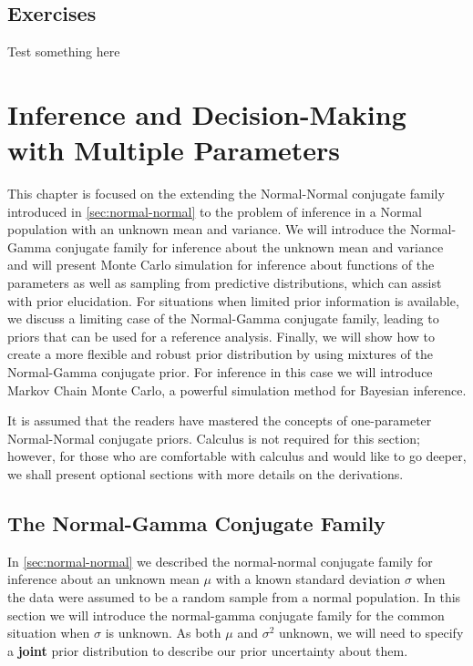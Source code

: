 \documentclass[]{book}
\theoremstyle{definition}
\theoremstyle{definition}
\theoremstyle{definition}
\theoremstyle{remark}
\begin{document}
\section{Exercises}\label{exercises-1}

Test something here

\chapter{Inference and Decision-Making with Multiple
Parameters}\label{inference-and-decision-making-with-multiple-parameters}

This chapter is focused on the extending the Normal-Normal conjugate
family introduced in \ref{sec:normal-normal} to the problem of inference
in a Normal population with an unknown mean and variance. We will
introduce the Normal-Gamma conjugate family for inference about the
unknown mean and variance and will present Monte Carlo simulation for
inference about functions of the parameters as well as sampling from
predictive distributions, which can assist with prior elucidation. For
situations when limited prior information is available, we discuss a
limiting case of the Normal-Gamma conjugate family, leading to priors
that can be used for a reference analysis. Finally, we will show how to
create a more flexible and robust prior distribution by using mixtures
of the Normal-Gamma conjugate prior. For inference in this case we will
introduce Markov Chain Monte Carlo, a powerful simulation method for
Bayesian inference.

It is assumed that the readers have mastered the concepts of
one-parameter Normal-Normal conjugate priors. Calculus is not required
for this section; however, for those who are comfortable with calculus
and would like to go deeper, we shall present optional sections with
more details on the derivations.

\section{The Normal-Gamma Conjugate Family}\label{sec:normal-gamma}

In \ref{sec:normal-normal} we described the normal-normal conjugate
family for inference about an unknown mean \(\mu\) with a known standard
deviation \(\sigma\) when the data were assumed to be a random sample
from a normal population. In this section we will introduce the
normal-gamma conjugate family for the common situation when \(\sigma\)
is unknown. As both \(\mu\) and \(\sigma^2\) unknown, we will need to
specify a \textbf{joint} prior distribution to describe our prior
uncertainty about them.
\end{document}

